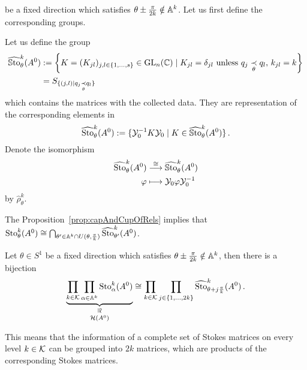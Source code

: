 be a fixed direction which satisfies $\theta\pm\frac{\pi}{2k}\notin\mathbb{A}^k$.
Let us first define the corresponding groups.
\begin{defn}
  Let us define the group
  \begin{align*}
    \widehat{\operatorname{\mathbb{S}to}}_{\theta}^k(A^0)&:=
      \left\{K=(K_{jl})_{j,l\in\{1,\dots,s\}}\in\operatorname{GL}_n(\mathbb{C})\mid
        K_{jl}=\delta_{jl} \text{~unless~}
        q_j \underset{\theta}{\prec} q_l \text{, } k_{jl}=k\right\}
    \\&=S_{\{(j,l) \mid q_j \underset{\theta}{\prec} q_l \}}
  \end{align*}
  which contains the matrices with the collected data. They are representation
  of the corresponding elements in
  \[
    \widehat{\operatorname{Sto}}_{\theta}^k(A^0):=
    \{\mathcal{Y}_0^{-1}K\mathcal{Y}_0\mid K\in\widehat{\operatorname{\mathbb{S}to}}_{\theta}^k(A^0) \} \,.
  \]
  Denote the isomorphism
  \begin{align*}
    \widehat{\operatorname{Sto}}_\theta^k(A^0) &\overset{\cong}{\longrightarrow}
                             \widehat{\operatorname{\mathbb{S}to}}_\theta^k(A^0)
    \\ \varphi &\longmapsto \mathcal{Y}_0\varphi\mathcal{Y}_0^{-1}
  \end{align*}
  by $\hat\rho_\theta^k$.
\end{defn}
The Proposition~\ref{prop:capAndCupOfRels} implies that $\operatorname{Sto}_{\theta}^k(A^0)\cong
\bigcap_{\theta'\in \mathbb{A}^k\cap U(\theta,\frac{\pi}{k})}\widehat{\operatorname{Sto}}_{\theta'}^k(A^0)$.
\begin{thm}\label{thm:theoremForlargerDecomp}
  Let $\theta\in S^1$ be a fixed direction which satisfies
  $\theta\pm\frac{\pi}{2k}\notin\mathbb{A}^k$, then there is a bijection
  \[
    \underset{\cH(A^0)}{%
      \underset{\text{\rotatebox[origin=c]{-90}{$\cong$}}}{\underbrace{%
        \prod_{k\in\cK}\prod_{\alpha\in\A^k}\Sto_\alpha^k(A^0)}}}
    \cong
    \prod_{k\in\cK}\prod_{j\in\{1,\dots,2k\}}
    \hat\Sto_{\theta+j\frac{\pi}{k}}^k(A^0) \,.
  \]
  \begin{s-rem}
    This means that the information of a complete set of Stokes matrices on every level
    $k\in\mathcal{K}$ can be grouped into $2k$ matrices, which are products of the
    corresponding Stokes matrices.
  \end{s-rem}
\end{thm}
